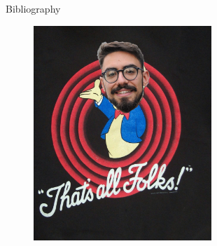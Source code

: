 \documentclass[xcolor=dvipsnames, 12pt]{beamer}
\begin{document}
\begin{frame}[allowframebreaks]{Bibliography}
        \tiny
        \printbibliography
\end{frame}

\begin{NoHyper}
\begin{frame}{}
    \centering
        \begin{figure}
                \begin{center}
                        \includegraphics[width=0.6\textwidth]{assets/the_end.jpg}
                \end{center}
        \end{figure}
        
\end{frame}
\end{NoHyper}
\end{document}
